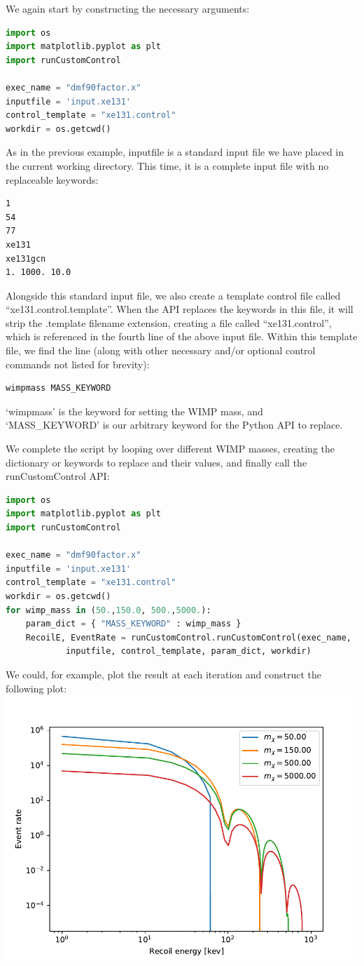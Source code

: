 \documentclass[12pt]{article}
\begin{document}
We again start by constructing the necessary arguments:
\begin{lstlisting}[language=python]
import os
import matplotlib.pyplot as plt
import runCustomControl

exec_name = "dmf90factor.x"
inputfile = 'input.xe131'
control_template = "xe131.control"
workdir = os.getcwd()
\end{lstlisting}
As in the previous example, inputfile is a standard input file we have placed in
the current working directory. This time, it is a complete input file with no
replaceable keywords:
\begin{verbatim}
1
54
77
xe131
xe131gcn
1. 1000. 10.0
\end{verbatim}
Alongside this standard input file, we also create a template control file
called ``xe131.control.template''. When the API replaces the keywords in this
file, it will strip the .template filename extension, creating a file called
``xe131.control'', which is referenced in the fourth line of the above input
file. Within this template file, we find the line (along with other necessary
and/or optional control commands not listed for brevity):
\begin{verbatim}
wimpmass MASS_KEYWORD
\end{verbatim}
`wimpmass' is the keyword for setting the WIMP mass, and `MASS\_KEYWORD' is our
arbitrary keyword for the Python API to replace.

We complete the script by looping over different WIMP masses, creating the
dictionary or keywords to replace and their values, and finally call the
runCustomControl API:
\begin{lstlisting}[language=python]
import os
import matplotlib.pyplot as plt
import runCustomControl

exec_name = "dmf90factor.x"
inputfile = 'input.xe131'
control_template = "xe131.control"
workdir = os.getcwd()
for wimp_mass in (50.,150.0, 500.,5000.):
    param_dict = { "MASS_KEYWORD" : wimp_mass }
    RecoilE, EventRate = runCustomControl.runCustomControl(exec_name,
            inputfile, control_template, param_dict, workdir)
\end{lstlisting}
We could, for example, plot the result at each iteration and construct the
following plot:
\includegraphics[width=\textwidth]{xe131.WIMPmassCompare.pdf}
\end{document}
